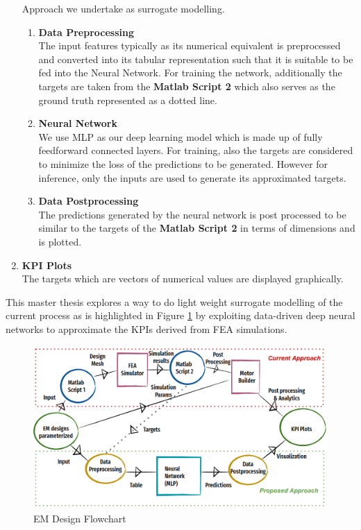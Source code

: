 \documentclass{report} %
\begin{document}
\begin{enumerate}
    Approach we undertake as surrogate modelling.
    \begin{enumerate}
        \item \textbf{Data Preprocessing} \\
        The input features typically as its numerical equivalent is preprocessed and converted into its tabular representation such that it is suitable to be fed into the Neural Network.
        For training the network, additionally the targets are taken from the \textbf{Matlab Script 2} which also serves as the ground truth represented as a dotted line.
        \item \textbf{Neural Network} \\
        We use \ac{MLP} as our deep learning model which is made up of fully feedforward connected layers. For training, also the targets are considered to minimize the loss of the predictions to be generated.
        However for inference, only the inputs are used to generate its approximated targets.
        \item \textbf{Data Postprocessing} \\
        The predictions generated by the neural network is post processed to be similar to the targets of the \textbf{Matlab Script 2} in terms of dimensions and is plotted.
    \end{enumerate}    
    \item \textbf{KPI Plots} \\
    The targets which are vectors of numerical values are displayed graphically.
\end{enumerate}

This master thesis explores a way to do light weight surrogate modelling of the current process as is highlighted in Figure \ref{fig:EM Design Flowchart} by 
exploiting data-driven deep neural networks to approximate the \ac{KPI}s derived from \ac{FEA} simulations.

\begin{figure}[H]
    \centering
    \includegraphics[width=1\textwidth]{./ReportImages/EM_design_flowchart_v2.png} 
    \caption{\ac{EM} Design Flowchart}
    \label{fig:EM Design Flowchart}
\end{figure}
\end{document}
